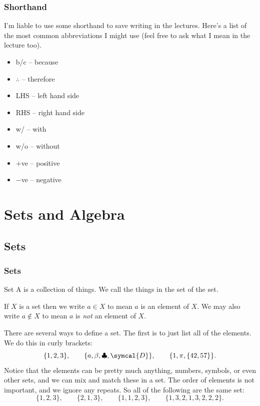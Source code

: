 \documentclass[fleqn]{LectureClass/LectureClass}
\begin{document}
    \section{Shorthand}
    I'm liable to use some shorthand to save writing in the lectures.
    Here's a list of the most common abbreviations I might use (feel free to ask what I mean in the lecture too).
    \begin{itemize}
        \item b/c -- because
        \item \(\therefore\) -- therefore
        \item LHS -- left hand side
        \item RHS -- right hand side
        \item w/ -- with
        \item w/o -- without
        \item \(+\)ve -- positive
        \item \(-\)ve -- negative
    \end{itemize}
    
    \part{Sets and Algebra}
    \chapter{Sets}
    \section{Sets}
    \begin{dfn}{Set}{}
        A  is a collection of things.
        We call the things in the set  of the set.
    \end{dfn}
    
    \begin{ntn}{}{}
        If \(X\) is a set then we write \(a \in X\) to mean \(a\) is an element of \(X\).
        We may also write \(a \notin X\) to mean \(a\) is \emph{not} an element of \(X\).
    \end{ntn}
    
    There are several ways to define a set.
    The first is to just list all of the elements.
    We do this in curly brackets:
    \begin{equation}
        \{1, 2, 3\}, \qquad \{a, \beta, \clubsuit, \symcal{D}\}, \qquad \{1, \pi, \{42, 57\}\}.
    \end{equation}
    Notice that the elements can be pretty much anything, numbers, symbols, or even other sets, and we can mix and match these in a set.
    The order of elements is not important, and we ignore any repeats.
    So all of the following are the same set:
    \begin{equation}
        \{1, 2, 3\}, \qquad \{2, 1, 3\}, \qquad \{1, 1, 2, 3\}, \qquad \{1, 3, 2, 1, 3, 2, 2, 2\}.
    \end{equation}
    
\end{document}

